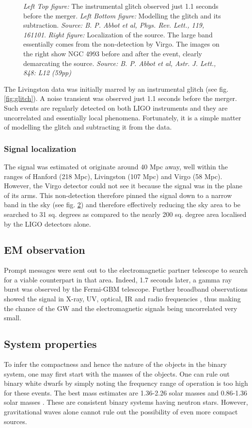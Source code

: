 \documentclass[a4paper,12pt,onecolumn,twoside]{article}
\begin{document}
\begin{figure}[t]
\begin{subfigure}{0.45\textwidth}
					\caption{}
					\label{fig:localize}
				\end{subfigure}
				\caption{\footnotesize \textit{Left Top figure:} The instrumental glitch observed just 1.1 seconds before the merger. \textit{Left Bottom figure:} Modelling the glitch and its subtraction. \textit{Source: B. P. Abbot et al, Phys. Rev. Lett., 119, 161101}. \textit{Right figure:} Localization of the source. The large band essentially comes from the non-detection by Virgo. The images on the right show NGC 4993 before and after the event, clearly demarcating the source. \textit{Source: B. P. Abbot et al, Astr. J. Lett., 848: L12 (59pp)}}
			\end{figure}
			The Livingston data was initially marred by an instrumental glitch (see fig. \ref{fig:glitch}). A noise transient was observed just 1.1 seconds before the merger. Such events are regularly detected on both LIGO instruments and they are uncorrelated and essentially local phenomena. Fortunately, it is a simple matter of modelling the glitch and subtracting it from the data.
			
		\subsubsection{Signal localization}
			The signal was estimated ot originate around 40 Mpc away, well within the ranges of Hanford (218 Mpc), Livingston (107 Mpc) and Virgo (58 Mpc). However, the Virgo detector could not see it because the signal was in the plane of its arms. This non-detection therefore pinned the signal down to a narrow band in the sky (see fig. \ref{fig:localize}) and therefore effectively reducing the sky area to be searched to 31 sq. degrees as compared to the nearly 200 sq. degree area localised by the LIGO detectors alone.
	\subsection{EM observation}
		Prompt messages were sent out to the electromagnetic partner telescope to search for a viable counterpart in that area. Indeed, 1.7 seconds later, a gamma ray burst was observed by the Fermi-GBM telescope. Further broadband  observations showed the signal in X-ray, UV, optical, IR and radio frequencies \cite{Abbot2017-EM}, thus making the chance of the GW and the electromagnetic signals being uncorrelated very small.
	\subsection{System properties}
		To infer the compactness and hence the nature of the objects in the binary system, one may first start with the masses of the objects. One can rule out binary white dwarfs by simply noting the frequency range of operation is too high for these events. The best mass estimates are 1.36-2.26 solar masses and 0.86-1.36 solar masses \cite{Abbot2017}. These are consistent binary systems having neutron stars. However, gravitational waves alone cannot rule out the possibility of even more compact sources.
		
\end{document}
